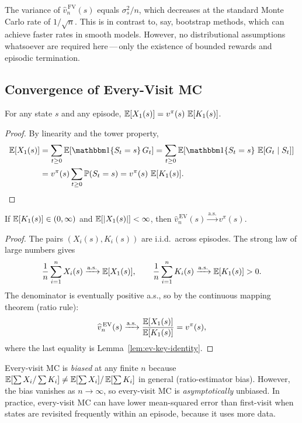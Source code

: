 \begin{remark}
The variance of $\widehat{v}_n^{\,\mathrm{FV}}(s)$ equals $\sigma_s^2/n$, which decreases at the standard Monte Carlo rate of $1/\sqrt{n}$.  This is in contrast to, say, bootstrap methods, which can achieve faster rates in smooth models.  However, no distributional assumptions whatsoever are required here\,---\,only the existence of bounded rewards and episodic termination.
\end{remark}

\subsection*{Convergence of Every-Visit MC}

\begin{lemma}
\label{lem:ev-key-identity}
For any state $s$ and any episode, $\operatorname{\mathbb{E}}[X_1(s)] = v^\pi(s)\,\operatorname{\mathbb{E}}[K_1(s)]$.
\end{lemma}

\begin{proof}
By linearity and the tower property,
\begin{align*}
  \E[X_1(s)]
  &= \sum_{t \ge 0} \E\!\left[\ind\{S_t = s\}\,G_t\right]
  = \sum_{t \ge 0} \E\!\left[\ind\{S_t = s\}\,\E[G_t \mid S_t]\right]\\
  &= v^\pi(s)\sum_{t \ge 0} \Prob(S_t = s)
  = v^\pi(s)\,\E[K_1(s)]. \qedhere
\end{align*}
\end{proof}

\begin{theorem}
\label{thm:ev-consistent}
If $\operatorname{\mathbb{E}}[K_1(s)] \in (0,\infty)$ and $\operatorname{\mathbb{E}}[|X_1(s)|] < \infty$, then $\widehat{v}_n^{\,\mathrm{EV}}(s) \xrightarrow{\mathrm{a.s.}} v^\pi(s)$.
\end{theorem}

\begin{proof}
The pairs $(X_i(s), K_i(s))$ are i.i.d.\ across episodes.  The strong law of large numbers gives
\[
  \frac{1}{n}\sum_{i=1}^n X_i(s) \xrightarrow{\mathrm{a.s.}} \operatorname{\mathbb{E}}[X_1(s)], \qquad
  \frac{1}{n}\sum_{i=1}^n K_i(s) \xrightarrow{\mathrm{a.s.}} \operatorname{\mathbb{E}}[K_1(s)] > 0.
\]
The denominator is eventually positive a.s., so by the continuous mapping theorem (ratio rule):
\[
  \widehat{v}_n^{\,\mathrm{EV}}(s) \xrightarrow{\mathrm{a.s.}} \frac{\operatorname{\mathbb{E}}[X_1(s)]}{\operatorname{\mathbb{E}}[K_1(s)]} = v^\pi(s),
\]
where the last equality is Lemma~\ref{lem:ev-key-identity}.
\end{proof}

\begin{remark}
Every-visit MC is \emph{biased} at any finite $n$ because $\operatorname{\mathbb{E}}[\sum X_i / \sum K_i] \ne \operatorname{\mathbb{E}}[\sum X_i]/\operatorname{\mathbb{E}}[\sum K_i]$ in general (ratio-estimator bias).  However, the bias vanishes as $n \to \infty$, so every-visit MC is \emph{asymptotically} unbiased.  In practice, every-visit MC can have lower mean-squared error than first-visit when states are revisited frequently within an episode, because it uses more data.
\end{remark}

